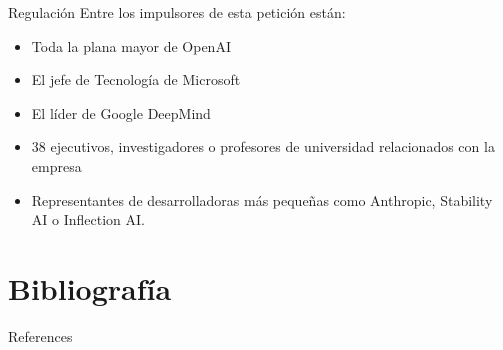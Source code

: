 \documentclass[11pt,aspectratio=169]{beamer}
\begin{document}
\begin{frame}{Regulación}
    Entre los impulsores de esta petición están:
    \begin{itemize}
        \item Toda la plana mayor de OpenAI \pause
        \item El jefe de Tecnología de Microsoft \pause
        \item El líder de Google DeepMind \pause
        \item 38 ejecutivos, investigadores o profesores de universidad relacionados con la empresa\pause
        \item Representantes de desarrolladoras más pequeñas como Anthropic, Stability AI o Inflection AI.
    \end{itemize}
\end{frame}


\section{Bibliografía}
\begin{frame}[allowframebreaks]{References}
    \nocite{*}
    
    
\end{frame}
\end{document}
